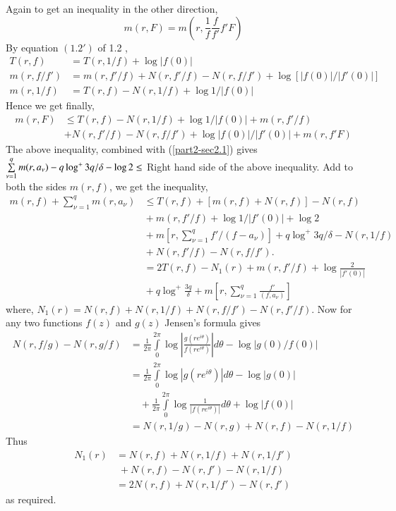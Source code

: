 Again to get an inequality in the other direction,
$$
m(r,F)=m\left(r,\frac{1}{f}\dfrac{f}{f'}f'F\right)
$$
By equation $(1.2')$ of 1.2 \ie,
\begin{align*}
T(r,f) & =T(r,1/f)+\log |f(0)|\\
m(r,f/f') &= m(r,f'/f)+N(r,f'/f)-N(r,f/f')+\log[|f(0)|/|f'(0)|]\\
m(r,1/f) &= T(r,f)-N(r,1/f)+\log 1/|f(0)|
\end{align*}\pageoriginale
Hence we get finally,
\begin{align*}
m(r,F) &\leq T(r,f) - N(r,1/f)+\log 1/|f(0)|+m(r,f'/f)\\
&+N(r,f'/f)- N(r,f/f')+\log |f(0)|/|f'(0)|+m(r,f'F)
\end{align*}
The above inequality, combined with (\ref{part2-sec2.1}) gives
$\sum\limits^{q}_{\nu=1}m(r,a_{\nu})-q\log^{+}\unskip\break 3q/\delta-\log 2\leq$
Right hand side of the above inequality. Add to both the sides
$m(r,f)$, we get the inequality,
\begin{align*}
m(r,f)+\sum^{q}_{\nu=1}m(r,a_{\nu}) &\leq
T(r,f)+[m(r,f)+N(r,f)]-N(r,f)\\
&{}+m(r,f'/f)+\log 1/|f'(0)|+\log
  2\\
&{}+m\left[r,\sum^{q}_{\nu=1}f'/(f-a_{\nu})\right]
+q\log^{+}3q/\delta-N(r,1/f)\\
&{}+N(r,f'/f)-N(r,f/f').\\
&= 2T(r,f)-N_{1}(r)+m(r,f'/f)+\log
  \frac{2}{|f'(0)|}\\
&{}+q\log^{+}\frac{3q}{\delta}
+m\left[r,\sum^{q}_{\nu=1}\frac{f'}{(f,a_{\nu})}\right]
\end{align*}
where, $N_{1}(r)=N(r,f)+N(r,1/f)+N(r,f/f')-N(r,f'/f)$. Now for any two
functions $f(z)$ and $g(z)$ Jensen's formula gives
\begin{align*}
N(r,f/g)-N(r,g/f)
&=\frac{1}{2\pi}\int\limits^{2\pi}_{0}\log\left|\frac{g(re^{i\theta})}{f(re^{i\theta})}\right|d\theta-\log|g(0)/f(0)|\\
&=
\frac{1}{2\pi}\int\limits^{2\pi}_{0}\log|g(re^{i\theta})|d\theta-\log|g(0)|\\
&\quad
+\frac{1}{2\pi}\int\limits^{2\pi}_{0}\log\frac{1}{|f(re^{i\theta})|}d\theta+\log
|f(0)|\\
&= N(r,1/g)-N(r,g)+N(r,f)-N(r,1/f)
\end{align*}
Thus\pageoriginale
\begin{align*}
N_{1}(r) &= N(r,f)+N(r,1/f)+N(r,1/f')\\
&{\;}+N(r,f)-N(r,f')-N(r,1/f)\\
&= 2N(r,f)+N(r,1/f')-N(r,f')
\end{align*}
as required.

